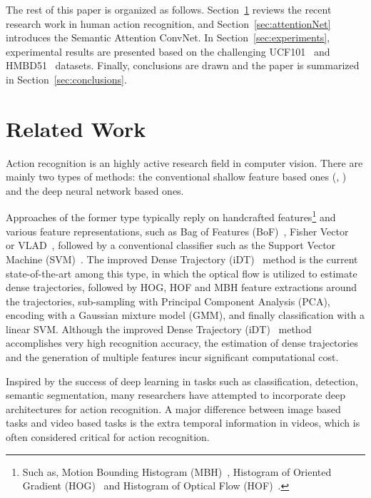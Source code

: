 \documentclass[10pt,twocolumn,letterpaper]{article}
\begin{document}
%
The rest of this paper is organized as follows. Section~\ref{sec:related} reviews the recent research work in human action recognition, and Section~\ref{sec:attentionNet} introduces the Semantic 
Attention ConvNet. In Section~\ref{sec:experiments}, experimental results are presented based on the challenging UCF101~\cite{soomro2012ucf101} and HMBD51~\cite{Kuehne11} datasets. Finally, conclusions are drawn and the paper is summarized in Section~\ref{sec:conclusions}.
%
\section{Related Work}\label{sec:related}
%
Action recognition is an highly active research field in computer vision. There are mainly two types of methods: the conventional shallow feature based ones (\eg, \cite{wang2011action, wang2013action, dalal2006human}) and the deep neural network based ones. 

%
Approaches of the former type typically reply on handcrafted features\footnote{Such as, Motion Bounding Histogram (MBH)~\cite{dalal2006human}, Histogram of Oriented Gradient (HOG)~\cite{dalal2005histograms} and Histogram of Optical Flow (HOF)~\cite{chaudhry2009histograms}.} and various feature representations, such as Bag of Features (BoF)~\cite{nowak2006sampling}, Fisher Vector~\cite{perronnin2010improving} or VLAD~\cite{jegou2010aggregating}, followed by a conventional classifier such as the Support Vector Machine (SVM)~\cite{cortes1995support}. The improved Dense Trajectory (iDT)~\cite{wang2013action} method is the current state-of-the-art among this type, in which the optical flow is utilized to estimate dense trajectories, followed by HOG, HOF and MBH feature extractions around the trajectories, sub-sampling with Principal Component Analysis (PCA), encoding with a Gaussian mixture model (GMM), and finally classification with a linear SVM. Although the improved Dense Trajectory (iDT)~\cite{wang2013action} method accomplishes very high recognition accuracy, the estimation of dense trajectories and the generation of multiple features incur significant computational cost. 


%
Inspired by the success of deep learning in tasks such as classification, detection, semantic segmentation, many researchers have attempted to incorporate deep architectures for action recognition. A major difference between image based tasks and video based tasks is the extra temporal information in videos, which is often considered critical for action recognition. 
\end{document}
